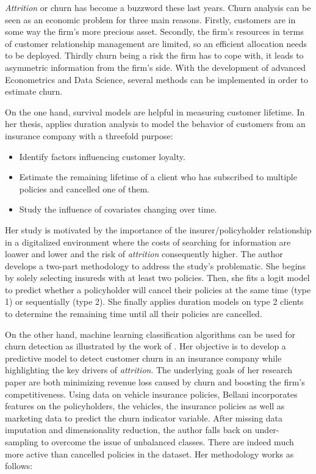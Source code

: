 \documentclass[
]{book}
\providecommand{\tightlist}{%
  \setlength{\itemsep}{0pt}\setlength{\parskip}{0pt}}
\begin{document}
\emph{Attrition} or churn has become a buzzword these last years. Churn analysis can be seen as an economic problem for three main reasons. Firstly, customers are in some way the firm's more precious asset. Secondly, the firm's resources in terms of customer relationship management are limited, so an efficient allocation needs to be deployed. Thirdly churn being a risk the firm has to cope with, it leads to asymmetric information from the firm's side. With the development of advanced Econometrics and Data Science, several methods can be implemented in order to estimate churn.

On the one hand, survival models are helpful in measuring customer lifetime. In her thesis, \citet{SURV_METHODS_INSURANCE} applies duration analysis to model the behavior of customers from an insurance company with a threefold purpose:

\begin{itemize}
\tightlist
\item
  Identify factors influencing customer loyalty.
\item
  Estimate the remaining lifetime of a client who has subscribed to multiple policies and cancelled one of them.
\item
  Study the influence of covariates changing over time.
\end{itemize}

Her study is motivated by the importance of the insurer/policyholder relationship in a digitalized environment where the costs of searching for information are loawer and lower and the risk of \emph{attrition} consequently higher. The author develops a two-part methodology to address the study's problematic. She begins by solely selecting insureds with at least two policies. Then, she fits a logit model to predict whether a policyholder will cancel their policies at the same time (type 1) or sequentially (type 2). She finally applies duration models on type 2 clients to determine the remaining time until all their policies are cancelled.

On the other hand, machine learning classification algorithms can be used for churn detection as illustrated by the work of \citet{CHURN_INSURANCE}. Her objective is to develop a predictive model to detect customer churn in an insurance company while highlighting the key drivers of \emph{attrition}. The underlying goals of her research paper are both minimizing revenue loss caused by churn and boosting the firm's competitiveness. Using data on vehicle insurance policies, Bellani incorporates features on the policyholders, the vehicles, the insurance policies as well as marketing data to predict the churn indicator variable. After missing data imputation and dimensionality reduction, the author falls back on under-sampling to overcome the issue of unbalanced classes. There are indeed much more active than cancelled policies in the dataset. Her methodology works as follows:
\end{document}
